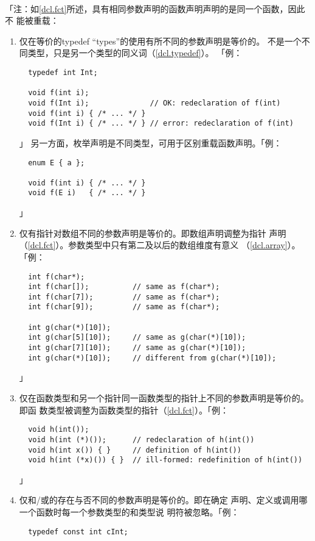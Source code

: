 \paragraph{}
「注：如\ref{dcl.fct}所述，具有相同参数声明的函数声明声明的是同一个函数，因此不
能被重载：
\begin{enumerate}
  \item{仅在等价的typedef ``types''的使用有所不同的参数声明是等价的。
    不是一个不同类型，只是另一个类型的同义词（\ref{dcl.typedef}）。
    「例：
\begin{lstlisting}
  typedef int Int;

  void f(int i);
  void f(Int i);              // OK: redeclaration of f(int)
  void f(int i) { /* ... */ }
  void f(Int i) { /* ... */ } // error: redeclaration of f(int)
\end{lstlisting}」
    另一方面，枚举声明是不同类型，可用于区别重载函数声明。「例：
\begin{lstlisting}
  enum E { a };

  void f(int i) { /* ... */ }
  void f(E i)   { /* ... */ }
\end{lstlisting}」}
  \item{仅有指针\tm{*}对数组\tm{[]}不同的参数声明是等价的。即数组声明调整为指针
    声明（\ref{dcl.fct}）。参数类型中只有第二及以后的数组维度有意义
    （\ref{dcl.array}）。「例：
\begin{lstlisting}
  int f(char*);
  int f(char[]);          // same as f(char*);
  int f(char[7]);         // same as f(char*);
  int f(char[9]);         // same as f(char*);

  int g(char(*)[10]);
  int g(char[5][10]);     // same as g(char(*)[10]);
  int g(char[7][10]);     // same as g(char(*)[10]);
  int g(char(*)[10]);     // different from g(char(*)[10]);
\end{lstlisting}」}
  \item{仅在函数类型和另一个指针同一函数类型的指针上不同的参数声明是等价的。即函
    数类型被调整为函数类型的指针（\ref{dcl.fct}）。「例：
\begin{lstlisting}
  void h(int());
  void h(int (*)());      // redeclaration of h(int())
  void h(int x()) { }     // definition of h(int())
  void h(int (*x)()) { }  // ill-formed: redefinition of h(int())
\end{lstlisting}」}
  \item{仅和/或的存在与否不同的参数声明是等价的。即在确定
    声明、定义或调用哪一个函数时每一个参数类型的和类型说
    明符被忽略。「例：
\begin{lstlisting}
  typedef const int cInt;


\end{lstlisting}}
\end{enumerate}
